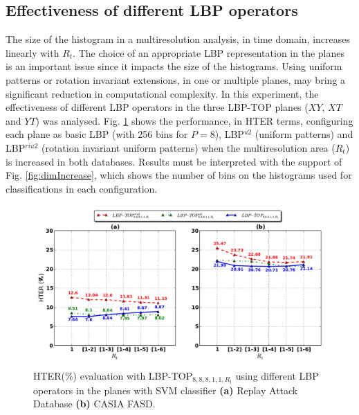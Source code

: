 \subsection{Effectiveness of different LBP operators}
\label{sec_different_lbp_operators}


The size of the histogram in a multiresolution analysis, in time domain, increases linearly with $R_t$. The choice of an appropriate LBP representation in the planes is an important issue since it impacts the size of the histograms. Using uniform patterns or rotation invariant extensions, in one or multiple planes, may bring a significant reduction in computational complexity. In this experiment, the effectiveness of different LBP operators in the three LBP-TOP planes ($XY$, $XT$ and $YT$) was analysed. Fig. \ref{fig:evaluation_LBP-operator} shows the performance, in HTER terms, configuring each plane as basic LBP (with 256 bins for $P=8$), LBP$^{u2}$ (uniform patterns) and LBP$^{riu2}$ (rotation invariant uniform patterns) when the multiresolution area ($R_t$) is increased in both databases. Results must be interpreted with the support of Fig. \ref{fig:dimIncrease}, which shows the number of bins on the histograms used for classifications in each configuration.


\begin{figure}[!btb]
\begin{center}
\includegraphics [width=\textwidth] {images/proposed_countermeasure/evaluation_LBP-operator.pdf}
\caption[HTER(\%) evaluation with LBP-TOP$_{8,8,8,1,1,R_t}$ using different LBP operators]{HTER(\%) evaluation with LBP-TOP$_{8,8,8,1,1,R_t}$ using different LBP operators in the planes with SVM classifier \textbf{(a)} Replay Attack Database \textbf{(b)} CASIA FASD.}
\label{fig:evaluation_LBP-operator}
\end{center}
\end{figure}

